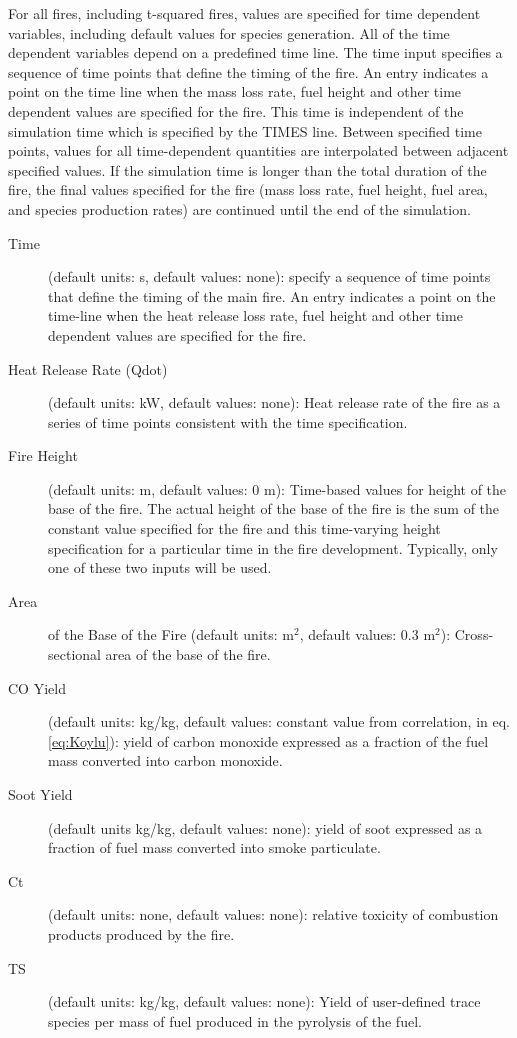 For all fires, including t-squared fires, values are specified for time dependent variables, including default values for species generation. All of the time dependent variables depend on a predefined time line. The time input specifies a sequence of time points that define the timing of the fire.  An entry indicates a point on the time line when the mass loss rate, fuel height and other time dependent values are specified for the fire.  This time is independent of the simulation time which is specified by the TIMES line. Between specified time points, values for all time-dependent quantities are interpolated between adjacent specified values. If the simulation time is longer than the total duration of the fire, the final values specified for the fire (mass loss rate, fuel height, fuel area, and species production rates) are continued until the end of the simulation.

\begin{description}
\item[Time] (default units: s, default values: none): specify a sequence of time points that define the timing of the main fire.  An entry indicates a point on the time-line when the heat release loss rate, fuel height and other time dependent values are specified for the fire.

\item[Heat Release Rate (Qdot)] (default units: kW, default values: none): Heat release rate of the fire as a series of time points consistent with the time specification.

\item[Fire Height] (default units: m, default values: 0 m): Time-based values for height of the base of the fire.  The actual height of the base of the fire is the sum of the constant value specified for the fire and this time-varying height specification for a particular time in the fire development. Typically, only one of these two inputs will be used.

\item[Area] of the Base of the Fire (default units: m$^2$, default values: 0.3 m$^2$): Cross-sectional area of the base of the fire.

\item[CO Yield] (default units: kg/kg, default values: constant value from correlation, in eq. \ref{eq:Koylu}): yield of carbon monoxide expressed as a fraction of the fuel mass converted into carbon monoxide.

\item[Soot Yield] (default units kg/kg, default values: none): yield of soot expressed as a fraction of fuel mass converted into smoke particulate.

\item[Ct] (default units: none, default values: none): relative toxicity of combustion products produced by the fire.

\item[TS] (default units: kg/kg, default values: none): Yield of user-defined trace species per mass of fuel produced in the pyrolysis of the fuel.
\end{description}

